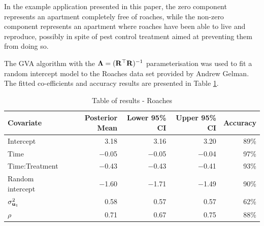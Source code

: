 \documentclass{amsart}[12pt]
\begin{document}
			In the example application presented in this paper, the zero component represents an apartment completely free of roaches, while the non-zero component represents an apartment where roaches have been able to live and reproduce, possibly in spite of pest control treatment aimed at preventing them from doing so.
					
			The GVA algorithm with the ${\boldsymbol \Lambda} = ({\bf R}^\top {\bf R})^{-1}$ parameterisation was used to fit a random
			intercept model to the Roaches data set provided by Andrew Gelman. The fitted co-efficients and accuracy
			results are presented in Table \ref{tab:application_roaches}.
					
					
					
			\begin{table}
				\caption{Table of results - Roaches}
				\label{tab:application_roaches}
				\begin{tabular}{|l|rrrr|}
					\hline
					Covariate          & Posterior Mean & Lower 95\% CI & Upper 95\% CI & Accuracy \\
					\hline
					Intercept          & 3.18           & 3.16          & 3.20          & 89\%     \\
					Time               & $-$0.05        & $-$0.05       & $-$0.04       & 97\%     \\
					Time:Treatment     & $-$0.43        & $-$0.43       & $-$0.41       & 93\%     \\
					Random intercept   & $-$1.60        & $-$1.71       & $-$1.49       & 90\%     \\
					$\sigma^2_{{\bf u}_1}$ & 0.58           & 0.57          & 0.57          & 62\%     \\
					$\rho$             & 0.71           & 0.67          & 0.75          & 88\%     \\
					\hline
				\end{tabular}
			\end{table}
					
\end{document}
